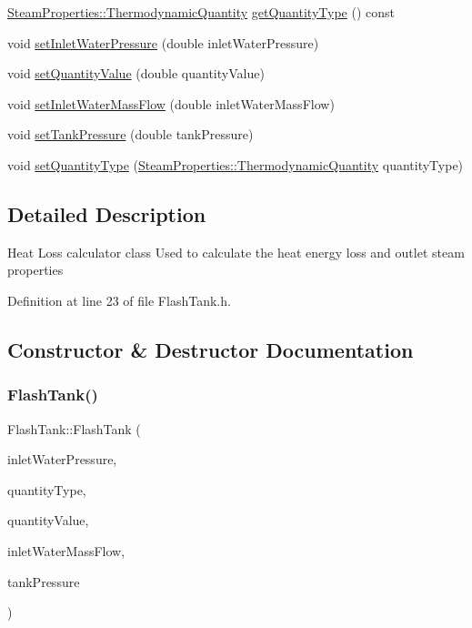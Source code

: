 \begin{DoxyCompactItemize}
\hyperlink{class_steam_properties_ae0294bedf7d178c2d8fb6aed0f62fbff}{Steam\+Properties\+::\+Thermodynamic\+Quantity} \hyperlink{class_flash_tank_a1800317a9b9dd8ff8fb18c693e846a45}{get\+Quantity\+Type} () const
\item 
void \hyperlink{class_flash_tank_aed0991a7902401d110fb2f4b472326f5}{set\+Inlet\+Water\+Pressure} (double inlet\+Water\+Pressure)
\item 
void \hyperlink{class_flash_tank_ac7392743aeaf8de6ce368814ea42e236}{set\+Quantity\+Value} (double quantity\+Value)
\item 
void \hyperlink{class_flash_tank_a2bcbd92d39ef3c760bdd65066ba3d34a}{set\+Inlet\+Water\+Mass\+Flow} (double inlet\+Water\+Mass\+Flow)
\item 
void \hyperlink{class_flash_tank_a8b3bb51a62dac4f76284dfdc114d83fe}{set\+Tank\+Pressure} (double tank\+Pressure)
\item 
void \hyperlink{class_flash_tank_a30aa7a42d1547f61b176da4a15e8e8ee}{set\+Quantity\+Type} (\hyperlink{class_steam_properties_ae0294bedf7d178c2d8fb6aed0f62fbff}{Steam\+Properties\+::\+Thermodynamic\+Quantity} quantity\+Type)
\end{DoxyCompactItemize}


\subsection{Detailed Description}
Heat Loss calculator class Used to calculate the heat energy loss and outlet steam properties 

Definition at line 23 of file Flash\+Tank.\+h.



\subsection{Constructor \& Destructor Documentation}
\mbox{\label{class_flash_tank_ad576e26508da35738127a65fd6ddc35d}} 
\subsubsection{\texorpdfstring{Flash\+Tank()}{FlashTank()}}
{\footnotesize\ttfamily Flash\+Tank\+::\+Flash\+Tank (\begin{DoxyParamCaption}\item[{double}]{inlet\+Water\+Pressure,  }\item[{\hyperlink{class_steam_properties_ae0294bedf7d178c2d8fb6aed0f62fbff}{Steam\+Properties\+::\+Thermodynamic\+Quantity}}]{quantity\+Type,  }\item[{double}]{quantity\+Value,  }\item[{double}]{inlet\+Water\+Mass\+Flow,  }\item[{double}]{tank\+Pressure }\end{DoxyParamCaption})}

